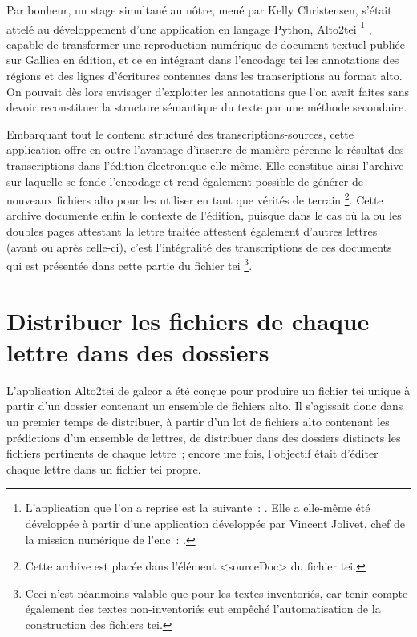 \documentclass[a4paper,12pt,twoside]{book}
\begin{document}
			Par bonheur, un stage simultané au nôtre, mené par Kelly Christensen, s'était attelé au développement d'une application en langage Python, Alto2tei
			\footnote{%
				L'application que l'on a reprise est la suivante~: \cite{christensenAltoTei2022}. Elle a elle-même été développée à partir d'une application développée par Vincent Jolivet, chef de la mission numérique de l'\gls{enc}~: \cite{jolivetAlto2tei2022}.
			}%
			, capable de transformer une reproduction numérique de document textuel publiée sur Gallica en édition, et ce en intégrant dans l'encodage \gls{tei} les annotations des régions et des lignes d'écritures contenues dans les transcriptions au format \gls{alto}. On pouvait dès lors envisager d'exploiter les annotations que l'on avait faites sans devoir reconstituer la structure sémantique du texte par une méthode secondaire.
			
			Embarquant tout le contenu structuré des transcriptions-sources, cette application offre en outre l'avantage d'inscrire de manière pérenne le résultat des transcriptions dans l'édition électronique elle-même. Elle constitue ainsi l'archive sur laquelle se fonde l'encodage et rend également possible de générer de nouveaux fichiers \gls{alto} pour les utiliser en tant que vérités de terrain
			\footnote{Cette archive est placée dans l'élément \textsf{<sourceDoc>} du fichier \gls{tei}.}.%
			Cette archive documente enfin le contexte de l'édition, puisque dans le cas où la ou les doubles pages attestant la lettre traitée attestent également d'autres lettres (avant ou après celle-ci), c'est l'intégralité des transcriptions de ces documents qui est présentée dans cette partie du fichier \gls{tei}%
			\footnote{Ceci n'est néanmoins valable que pour les textes inventoriés, car tenir compte également des textes non-inventoriés eut empêché l'automatisation de la construction des fichiers \gls{tei}.}.
			
		\section{Distribuer les fichiers de chaque lettre dans des dossiers}
		
			L'application Alto2tei de \gls{galcor} a été conçue pour produire un fichier \gls{tei} unique à partir d'un dossier contenant un ensemble de fichiers \gls{alto}. Il s'agissait donc dans un premier temps de distribuer, à partir d'un lot de fichiers \gls{alto} contenant les \glspl{prédiction} d'un ensemble de lettres, de distribuer dans des dossiers distincts les fichiers pertinents de chaque lettre~; encore une fois, l'objectif était d'éditer chaque lettre dans un fichier \gls{tei} propre.
			
\end{document}
